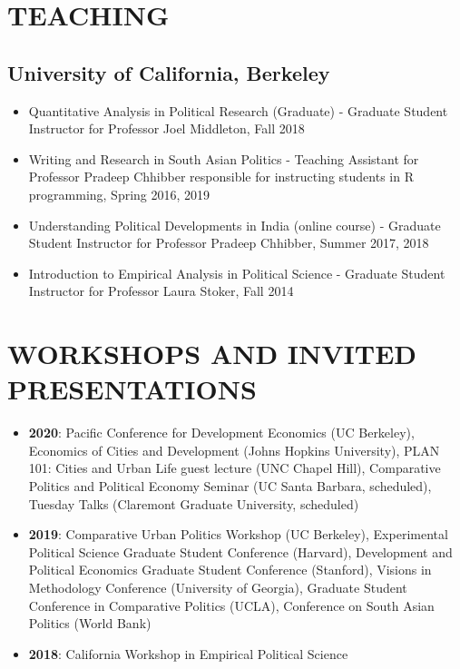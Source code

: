 \documentclass[10pt]{article}
\begin{document}
\vspace{3mm}
\section*{TEACHING}


\subsection*{University of California, Berkeley}

\begin{itemize}
	\item[]Quantitative Analysis in Political Research (Graduate) - Graduate Student Instructor for Professor Joel Middleton, Fall 2018 
		\item[]Writing and Research in South Asian Politics - Teaching Assistant for Professor Pradeep Chhibber responsible for instructing students in \textsf{R} programming, Spring 2016, 2019
	\item[]Understanding Political Developments in India (online course) - Graduate Student Instructor for Professor Pradeep Chhibber, Summer 2017, 2018
	\item[]Introduction to Empirical Analysis in Political Science - Graduate Student Instructor for Professor Laura Stoker, Fall 2014	
\end{itemize}

\vspace{3mm}
\section*{WORKSHOPS AND INVITED PRESENTATIONS}

\begin{itemize}[nosep]
\item[] \textbf{2020}: Pacific Conference for Development Economics (UC Berkeley), Economics of Cities and Development (Johns Hopkins University), PLAN 101: Cities and Urban Life guest lecture (UNC Chapel Hill), Comparative Politics and Political Economy Seminar (UC Santa Barbara, scheduled), Tuesday Talks (Claremont Graduate University, scheduled)
\item[] \textbf{2019}: Comparative Urban Politics Workshop (UC Berkeley), Experimental Political Science Graduate Student Conference (Harvard), Development and Political Economics Graduate Student Conference (Stanford), Visions in Methodology Conference (University of Georgia), Graduate Student Conference in Comparative Politics (UCLA), Conference on South Asian Politics (World Bank)
\item[] \textbf{2018}: California Workshop in Empirical Political Science
\end{itemize}
\end{document}
